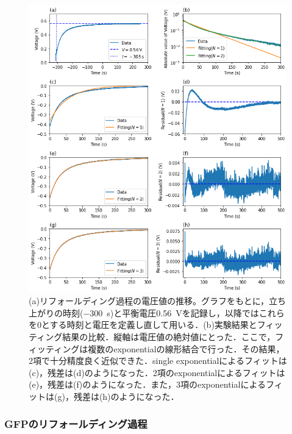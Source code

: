 \documentclass[a4paper,11pt, titlepage]{jsarticle}
\begin{document}
\begin{figure}[htbp]
    \centering
    \includegraphics[width=14cm]{refolding.png}
    \caption{(a)リフォールディング過程の電圧値の推移。グラフをもとに，立ち上がりの時刻(\SI{-300}{\second})と平衡電圧\SI{0.56}{\volt}を記録し，以降ではこれらを0とする時刻と電圧を定義し直して用いる．(b)実験結果とフィッティング結果の比較．縦軸は電圧値の絶対値にとった．ここで，フィッティングは複数のexponentialの線形結合で行った．その結果，2項で十分精度良く近似できた．single exponentialによるフィットは(c)，残差は(d)のようになった．2項のexponentialによるフィットは(e)，残差は(f)のようになった．また，3項のexponentialによるフィットは(g)，残差は(h)のようになった．}
    \label{fig:refolding}
\end{figure}

\subsubsection{GFPのリフォールディング過程}
\end{document}
